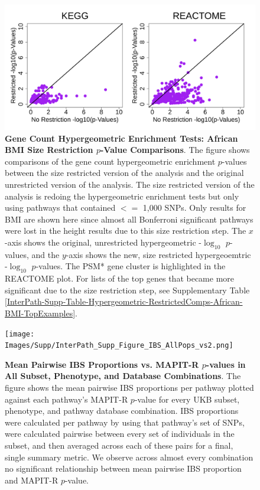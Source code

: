 \documentclass[12pt, a4paper]{article}
\begin{document}
\begin{figure}[htbp]
\centering
\includegraphics[scale=.45]{Images/Supp/InterPath_Supp_Figure_Hypergeometric_RestrictedComps_African_BMI_vs1.png}
\caption[TBD]{\textbf{Gene Count Hypergeometric Enrichment Tests: African BMI Size Restriction $p$-Value Comparisons}. The figure shows comparisons of the gene count hypergeometric enrichment $p$-values between the size restricted version of the analysis and the original unrestricted version of the analysis. The size restricted version of the analysis is redoing the hypergeometric enrichment tests but only using pathways that contained $<=$ 1,000 SNPs. Only results for BMI are shown here since almost all Bonferroni significant pathways were lost in the height results due to this size restriction step. The $x$-axis shows the original, unrestricted hypergeometric -$\log_{10}$ $p$-values, and the $y$-axis shows the new, size restricted hypergeoemtric -$\log_{10}$ $p$-values. The PSM* gene cluster is highlighted in the REACTOME plot. For lists of the top genes that became more significant due to the size restriction step, see Supplementary Table \ref{InterPath-Supp-Table-Hypergeometric-RestrictedComps-African-BMI-TopExamples}.}
\label{InterPath-Supp-Figure-Hypergeometric-RestrictedComps-African-BMI}
\end{figure}
\clearpage

\setlength{\footskip}{3cm}
\begin{figure}[htbp]
\centering
\vspace*{-2cm}
\texttt{[image: Images/Supp/InterPath\_Supp\_Figure\_IBS\_AllPops\_vs2.png]}
\caption[TBD]{\textbf{Mean Pairwise IBS Proportions vs. MAPIT-R $p$-values in All Subset, Phenotype, and Database Combinations}. The figure shows the mean pairwise IBS proportions per pathway plotted against each pathway's MAPIT-R $p$-value for every UKB subset, phenotype, and pathway database combination. IBS proportions were calculated per pathway by using that pathway's set of SNPs, were calculated pairwise between every set of individuals in the subset, and then averaged across each of these pairs for a final, single summary metric. We observe across almost every combination no significant relationship between mean pairwise IBS proportion and MAPIT-R $p$-value.}
\label{InterPath-Supp-Figure-IBS-AllPops}
\end{figure}
\clearpage
\setlength{\footskip}{1cm}
\end{document}
